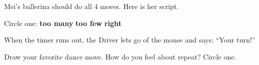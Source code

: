 \begin{exercise}
Mei's ballerina should do all 4 moves. Here is her script.
\begin{center}
\begin{scratch}[scale=0.9]
\end{scratch}
\end{center}
Circle one: \qquad \textbf{too many} \qquad \textbf{too few} \qquad \textbf{right}
\end{exercise}

\begin{tip}
When the timer runs out, the Driver lets go of the mouse and says: \enquote{Your turn!}
\end{tip}

\begin{vocab}
\end{vocab}

\begin{reflection}
Draw your favorite dance move. How do you feel about repeat? Circle one.

\begin{center}
\Huge\faSmile[regular]\qquad\faMeh[regular]\qquad\faFrown[regular]
\end{center}
\answerspace{3.5cm}
\end{reflection}
